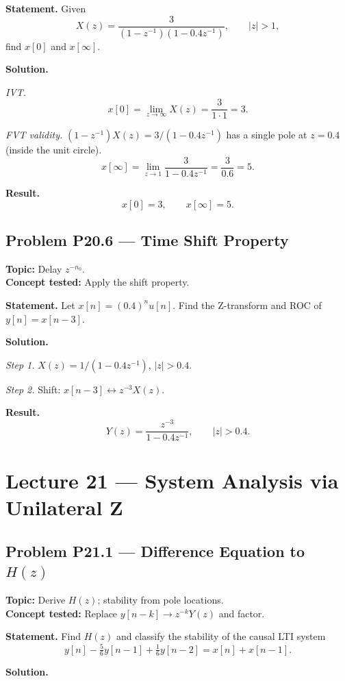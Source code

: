 \documentclass[11pt]{article}
\begin{document}
\textbf{Statement.} Given
\[
X(z) = \frac{3}{(1-z^{-1})(1-0.4z^{-1})},\qquad |z|>1,
\]
find $x[0]$ and $x[\infty]$.

\textbf{Solution.}

\textit{IVT.}
\[
x[0] = \lim_{z\to\infty}X(z) = \frac{3}{1\cdot 1} = 3.
\]

\textit{FVT validity.} $(1-z^{-1})X(z) = 3/(1-0.4z^{-1})$ has a single pole
at $z=0.4$ (inside the unit circle). \checkmark
\[
x[\infty] = \lim_{z\to 1}\frac{3}{1-0.4z^{-1}} = \frac{3}{0.6} = 5.
\]

\textbf{Result.}
\[
\boxed{\,x[0] = 3,\qquad x[\infty] = 5.\,}
\]

\subsection{Problem P20.6 --- Time Shift Property}
\textbf{Topic:} Delay $z^{-n_{0}}$.\\
\textbf{Concept tested:} Apply the shift property.

\textbf{Statement.} Let $x[n] = (0.4)^{n}u[n]$. Find the Z-transform and
ROC of $y[n] = x[n-3]$.

\textbf{Solution.}

\textit{Step 1.} $X(z) = 1/(1-0.4z^{-1})$, $|z|>0.4$.

\textit{Step 2.} Shift: $x[n-3]\leftrightarrow z^{-3}X(z)$.

\textbf{Result.}
\[
\boxed{\,Y(z) = \frac{z^{-3}}{1-0.4z^{-1}},\qquad |z|>0.4.\,}
\]

\section{Lecture 21 --- System Analysis via Unilateral Z}

\subsection{Problem P21.1 --- Difference Equation to $H(z)$}
\textbf{Topic:} Derive $H(z)$; stability from pole locations.\\
\textbf{Concept tested:} Replace $y[n-k]\to z^{-k}Y(z)$ and factor.

\textbf{Statement.} Find $H(z)$ and classify the stability of the causal LTI system
\[
y[n]-\tfrac{5}{6}y[n-1]+\tfrac{1}{6}y[n-2] = x[n]+x[n-1].
\]

\textbf{Solution.}
\end{document}
